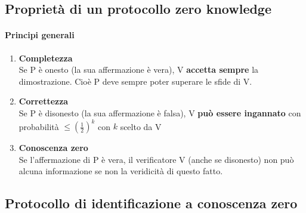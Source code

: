 \documentclass[10pt]{book}
\begin{document}
\subsection{Proprietà di un protocollo zero knowledge}
\paragraph{Principi generali}\begin{enumerate}
	\item \textbf{Completezza}\\
	Se P è onesto (la sua affermazione è vera), V \textbf{accetta sempre} la dimostrazione. Cioè P deve sempre poter superare le sfide di V.
	\item \textbf{Correttezza}\\
	Se P è disonesto (la sua affermazione è falsa), V \textbf{può essere ingannato} con probabilità $\leq \left(\frac{1}{2}\right)^k$ con $k$ scelto da V
	\item \textbf{Conoscenza zero}\\
	Se l'affermazione di P è vera, il verificatore V (anche se disonesto) non può alcuna informazione se non la veridicità di questo fatto.
\end{enumerate}
\subsection{Protocollo di identificazione a conoscenza zero}
\end{document}
